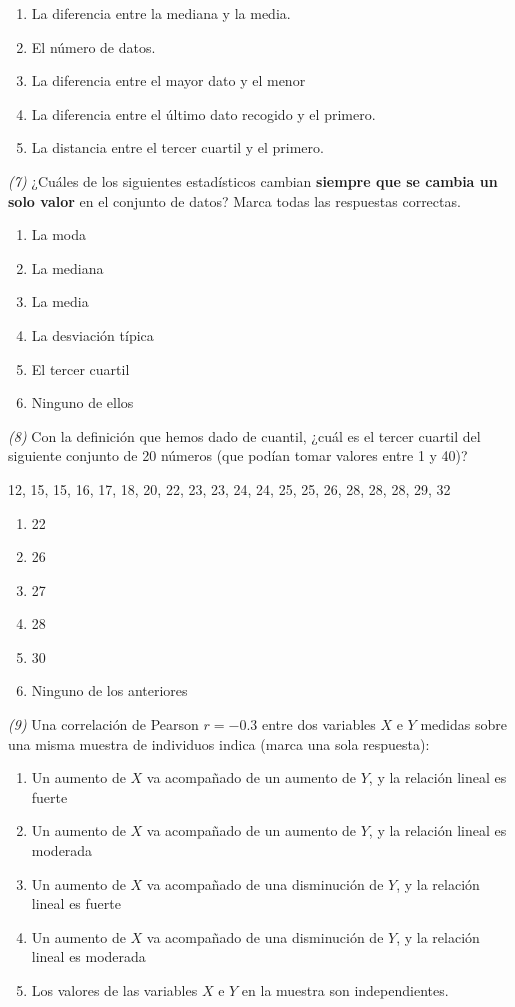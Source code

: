 \documentclass[
]{book}
\providecommand{\tightlist}{%
  \setlength{\itemsep}{0pt}\setlength{\parskip}{0pt}}
\theoremstyle{definition}
\theoremstyle{definition}
\theoremstyle{definition}
\theoremstyle{definition}
\theoremstyle{remark}
\begin{document}
\begin{enumerate}
\def\labelenumi{\arabic{enumi}.}
\tightlist
\item
  La diferencia entre la mediana y la media.
\item
  El número de datos.
\item
  La diferencia entre el mayor dato y el menor
\item
  La diferencia entre el último dato recogido y el primero.
\item
  La distancia entre el tercer cuartil y el primero.
\end{enumerate}

\emph{(7)} ¿Cuáles de los siguientes estadísticos cambian \textbf{siempre que se cambia un solo valor} en el conjunto de datos? Marca todas las respuestas correctas.

\begin{enumerate}
\def\labelenumi{\arabic{enumi}.}
\tightlist
\item
  La moda
\item
  La mediana
\item
  La media
\item
  La desviación típica
\item
  El tercer cuartil
\item
  Ninguno de ellos
\end{enumerate}

\emph{(8)} Con la definición que hemos dado de cuantil, ¿cuál es el tercer cuartil del siguiente conjunto de 20 números (que podían tomar valores entre 1 y 40)?

12, 15, 15, 16, 17, 18, 20, 22, 23, 23, 24, 24, 25, 25, 26, 28, 28, 28, 29, 32

\begin{enumerate}
\def\labelenumi{\arabic{enumi}.}
\tightlist
\item
  22
\item
  26
\item
  27
\item
  28
\item
  30
\item
  Ninguno de los anteriores
\end{enumerate}

\emph{(9)} Una correlación de Pearson \(r=-0.3\) entre dos variables \(X\) e \(Y\) medidas sobre una misma muestra de individuos indica (marca una sola respuesta):

\begin{enumerate}
\def\labelenumi{\arabic{enumi}.}
\tightlist
\item
  Un aumento de \(X\) va acompañado de un aumento de \(Y\), y la relación lineal es fuerte
\item
  Un aumento de \(X\) va acompañado de un aumento de \(Y\), y la relación lineal es moderada
\item
  Un aumento de \(X\) va acompañado de una disminución de \(Y\), y la relación lineal es fuerte
\item
  Un aumento de \(X\) va acompañado de una disminución de \(Y\), y la relación lineal es moderada
\item
  Los valores de las variables \(X\) e \(Y\) en la muestra son independientes.
\end{enumerate}
\end{document}
